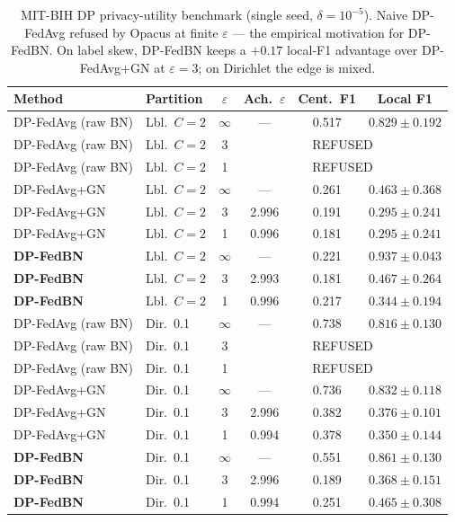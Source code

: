 \documentclass[conference]{IEEEtran}
\begin{document}
\begin{table}[t]
\centering
\caption{MIT-BIH DP privacy-utility benchmark (single seed, $\delta{=}10^{-5}$). Naive DP-FedAvg refused by Opacus at finite $\varepsilon$ --- the empirical motivation for DP-FedBN. On label skew, DP-FedBN keeps a $+0.17$ local-F1 advantage over DP-FedAvg+GN at $\varepsilon{=}3$; on Dirichlet the edge is mixed.}
\label{tab:dp}
\footnotesize
\setlength{\tabcolsep}{3pt}
\begin{tabular}{llcccc}
\toprule
Method & Partition & $\varepsilon$ & Ach.\ $\varepsilon$ & Cent.\ F1 & Local F1 \\
\midrule
DP-FedAvg (raw BN) & Lbl.\ $C{=}2$ & $\infty$ & --- & 0.517 & $0.829{\pm}0.192$ \\
DP-FedAvg (raw BN) & Lbl.\ $C{=}2$ & 3 & \multicolumn{3}{c}{REFUSED} \\
DP-FedAvg (raw BN) & Lbl.\ $C{=}2$ & 1 & \multicolumn{3}{c}{REFUSED} \\
DP-FedAvg+GN & Lbl.\ $C{=}2$ & $\infty$ & --- & 0.261 & $0.463{\pm}0.368$ \\
DP-FedAvg+GN & Lbl.\ $C{=}2$ & 3 & 2.996 & 0.191 & $0.295{\pm}0.241$ \\
DP-FedAvg+GN & Lbl.\ $C{=}2$ & 1 & 0.996 & 0.181 & $0.295{\pm}0.241$ \\
\textbf{DP-FedBN} & Lbl.\ $C{=}2$ & $\infty$ & --- & 0.221 & $\mathbf{0.937{\pm}0.043}$ \\
\textbf{DP-FedBN} & Lbl.\ $C{=}2$ & 3 & 2.993 & 0.181 & $\mathbf{0.467{\pm}0.264}$ \\
\textbf{DP-FedBN} & Lbl.\ $C{=}2$ & 1 & 0.996 & 0.217 & $\mathbf{0.344{\pm}0.194}$ \\
\midrule
DP-FedAvg (raw BN) & Dir.\ 0.1 & $\infty$ & --- & 0.738 & $0.816{\pm}0.130$ \\
DP-FedAvg (raw BN) & Dir.\ 0.1 & 3 & \multicolumn{3}{c}{REFUSED} \\
DP-FedAvg (raw BN) & Dir.\ 0.1 & 1 & \multicolumn{3}{c}{REFUSED} \\
DP-FedAvg+GN & Dir.\ 0.1 & $\infty$ & --- & 0.736 & $0.832{\pm}0.118$ \\
DP-FedAvg+GN & Dir.\ 0.1 & 3 & 2.996 & 0.382 & $0.376{\pm}0.101$ \\
DP-FedAvg+GN & Dir.\ 0.1 & 1 & 0.994 & 0.378 & $0.350{\pm}0.144$ \\
\textbf{DP-FedBN} & Dir.\ 0.1 & $\infty$ & --- & 0.551 & $0.861{\pm}0.130$ \\
\textbf{DP-FedBN} & Dir.\ 0.1 & 3 & 2.996 & 0.189 & $0.368{\pm}0.151$ \\
\textbf{DP-FedBN} & Dir.\ 0.1 & 1 & 0.994 & 0.251 & $0.465{\pm}0.308$ \\
\bottomrule
\end{tabular}
\end{table}
\end{document}
